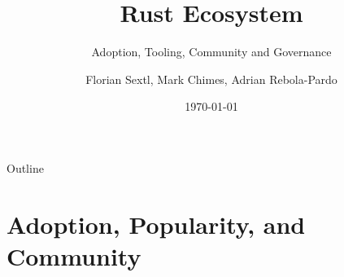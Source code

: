 \documentclass{beamer}
\title{Rust Ecosystem}
\subtitle{Adoption, Tooling, Community and Governance}
\author{Florian Sextl, Mark Chimes, Adrian Rebola-Pardo}
\date{\today}
\begin{document}
\begin{frame}
    \titlepage
\end{frame}

\begin{frame}{Outline}
\tableofcontents
\end{frame}

\section{Adoption, Popularity, and Community}

\end{document}
